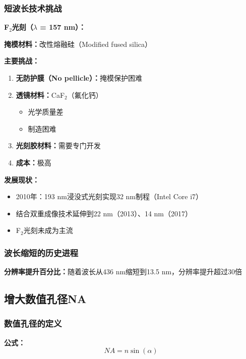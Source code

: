 \documentclass[UTF8,12pt,a4paper]{ctexart}
\begin{document}
\subsubsection{短波长技术挑战}

\textbf{F$_2$光刻（$\lambda$ = 157 nm）：}

\textbf{掩模材料：}改性熔融硅（Modified fused silica）

\textbf{主要挑战：}
\begin{enumerate}
    \item \textbf{无防护膜（No pellicle）：}掩模保护困难
    \item \textbf{透镜材料：}CaF$_2$（氟化钙）
    \begin{itemize}
        \item 光学质量差
        \item 制造困难
    \end{itemize}
    \item \textbf{光刻胶材料：}需要专门开发
    \item \textbf{成本：}极高
\end{enumerate}

\textbf{发展现状：}
\begin{itemize}
    \item 2010年：193 nm浸没式光刻实现32 nm制程（Intel Core i7）
    \item 结合双重成像技术延伸到22 nm（2013）、14 nm（2017）
    \item F$_2$光刻未成为主流
\end{itemize}

\subsubsection{波长缩短的历史进程}

\textbf{分辨率提升百分比：}随着波长从436 nm缩短到13.5 nm，分辨率提升超过30倍

\subsection{增大数值孔径NA}

\subsubsection{数值孔径的定义}

\textbf{公式：}
\begin{equation}
NA = n \sin(\alpha)
\end{equation}
\end{document}
